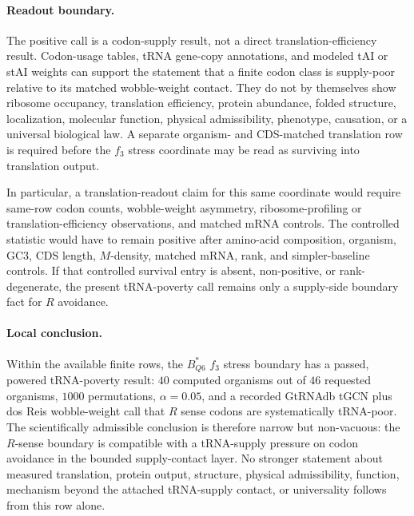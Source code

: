 \paragraph{Readout boundary.}
The positive call is a codon-supply result, not a direct translation-efficiency result.  Codon-usage tables, tRNA gene-copy annotations, and modeled tAI or stAI weights can support the statement that a finite codon class is supply-poor relative to its matched wobble-weight contact.  They do not by themselves show ribosome occupancy, translation efficiency, protein abundance, folded structure, localization, molecular function, physical admissibility, phenotype, causation, or a universal biological law.  A separate organism- and CDS-matched translation row is required before the $f_3$ stress coordinate may be read as surviving into translation output.

In particular, a translation-readout claim for this same coordinate would require same-row codon counts, wobble-weight asymmetry, ribosome-profiling or translation-efficiency observations, and matched mRNA controls.  The controlled statistic would have to remain positive after amino-acid composition, organism, GC3, CDS length, $M$-density, matched mRNA, rank, and simpler-baseline controls.  If that controlled survival entry is absent, non-positive, or rank-degenerate, the present tRNA-poverty call remains only a supply-side boundary fact for $R$ avoidance.

\paragraph{Local conclusion.}
Within the available finite rows, the $B^{\ast}_{Q6}$ $f_3$ stress boundary has a passed, powered tRNA-poverty result: $40$ computed organisms out of $46$ requested organisms, $1000$ permutations, $\alpha=0.05$, and a recorded GtRNAdb tGCN plus dos Reis wobble-weight call that $R$ sense codons are systematically tRNA-poor.  The scientifically admissible conclusion is therefore narrow but non-vacuous: the $R$-sense boundary is compatible with a tRNA-supply pressure on codon avoidance in the bounded supply-contact layer.  No stronger statement about measured translation, protein output, structure, physical admissibility, function, mechanism beyond the attached tRNA-supply contact, or universality follows from this row alone.